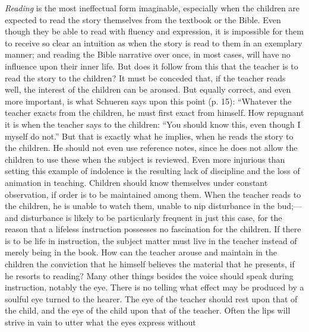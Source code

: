 \emph{Reading} is the most ineffectual form imaginable, especially when the children are expected to read the story themselves from the textbook or the Bible. Even though they be able to read with fluency and expression, it is impossible
for them to receive so clear an intuition as when the story is read to them in an exemplary manner; and reading the Bible narrative over once, in most cases, will have no influence upon their inner life. But does it follow from this that the teacher is to read the story to the children? It must be conceded that, if the teacher reads well, the interest of the children can be aroused. But equally correct, and even more important, is what Schueren says upon this point (p. 15): “Whatever the teacher exacts from the children, he must first exact from himself. How repugnant it is when the teacher says to the children: “You should know this, even though I myself do not.” But that is exactly what he implies, when he reads the story to the children. He should not even use reference notes, since he does not allow the children to use these when the subject is reviewed. Even more injurious than setting this example of indolence is the resulting lack of discipline and the loss of animation in teaching. Children should know themselves under constant observation, if order is to be maintained among them. When the teacher reads to the children, he is unable to watch them, unable to nip disturbance in the bud;—and disturbance is likely to be particularly frequent in just this case, for the reason that a lifeless instruction possesses no fascination for the children. If there is to be life in instruction, the subject matter must live in the teacher instead of merely being in the book. How can the teacher arouse and maintain in the children the conviction that he himself believes the material that he presents, if he resorts to reading? Many other things besides the voice should speak during instruction, notably the eye. There is no telling what effect may be produced by a soulful eye turned to the hearer. The eye of the teacher should rest upon that of the child, and the eye of the child upon that of the teacher. Often the lips will strive in vain to utter what the eyes express without
